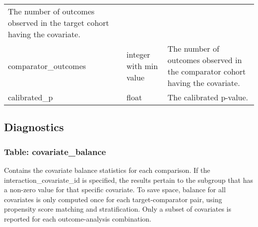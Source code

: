\documentclass[
]{article}
\begin{document}
\begin{longtable}[]{@{}lll@{}}
\begin{minipage}[t]{0.50\columnwidth}
The number of outcomes observed in the target cohort having the
covariate.\strut
\end{minipage}\tabularnewline
\begin{minipage}[t]{0.23\columnwidth}\raggedright
comparator\_outcomes\strut
\end{minipage} & \begin{minipage}[t]{0.18\columnwidth}\raggedright
integer with min value\strut
\end{minipage} & \begin{minipage}[t]{0.50\columnwidth}\raggedright
The number of outcomes observed in the comparator cohort having the
covariate.\strut
\end{minipage}\tabularnewline
\begin{minipage}[t]{0.23\columnwidth}\raggedright
calibrated\_p\strut
\end{minipage} & \begin{minipage}[t]{0.18\columnwidth}\raggedright
float\strut
\end{minipage} & \begin{minipage}[t]{0.50\columnwidth}\raggedright
The calibrated p-value.\strut
\end{minipage}\tabularnewline
\bottomrule
\end{longtable}

\hypertarget{diagnostics}{%
\subsection{Diagnostics}\label{diagnostics}}

\hypertarget{table-covariate_balance}{%
\subsubsection{Table:
covariate\_balance}\label{table-covariate_balance}}

Contains the covariate balance statistics for each comparison. If the
interaction\_covariate\_id is specified, the results pertain to the
subgroup that has a non-zero value for that specific covariate. To save
space, balance for all covariates is only computed once for each
target-comparator pair, using propensity score matching and
stratification. Only a subset of covariates is reported for each
outcome-analysis combination.
\end{document}
